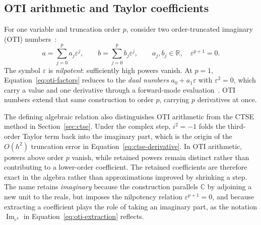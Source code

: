 \documentclass[10pt]{article}
\begin{document}
\newpage
\subsection{OTI arithmetic and Taylor coefficients}
\label{sec:oti}
For one variable and truncation order $p$, consider two order-truncated imaginary
(OTI) numbers~\cite{aristizabal2020}:
\begin{equation}
\label{eq:oti-factors}
 a=\sum_{j=0}^{p}a_j\varepsilon^j,\qquad
 b=\sum_{j=0}^{p}b_j\varepsilon^j,\qquad
 a_j,b_j\in\mathbb R,\quad\varepsilon^{p+1}=0.
\end{equation}
The symbol $\varepsilon$ is \emph{nilpotent}: sufficiently high powers vanish.
At $p=1$, Equation~\eqref{eq:oti-factors} reduces to the \emph{dual numbers}
$a_0+a_1\varepsilon$ with $\varepsilon^2=0$, which carry a value and one
derivative through a forward-mode evaluation~\cite{multi-dual}. OTI numbers extend that same
construction to order $p$, carrying $p$ derivatives at once.

The defining algebraic relation also distinguishes OTI arithmetic from the
CTSE method in Section~\ref{sec:ctse}.
Under the complex step, $i^2=-1$ folds the third-order Taylor term back into the
imaginary part, which is the origin of the $O(h^2)$ truncation error in
Equation~\eqref{eq:ctse-derivative}. In OTI arithmetic, powers above order $p$
vanish, while retained powers remain distinct rather than contributing to a
lower-order coefficient. The retained coefficients are therefore exact in the
algebra rather than approximations improved by shrinking a step. The name
retains \emph{imaginary} because the construction parallels $\mathbb C$ by
adjoining a new unit to the reals, but imposes the nilpotency relation
$\varepsilon^{p+1}=0$, and because extracting a coefficient plays the role of taking
an imaginary part, as the notation $\operatorname{Im}_{\varepsilon^k}$ in
Equation~\eqref{eq:oti-extraction} reflects.
\end{document}

